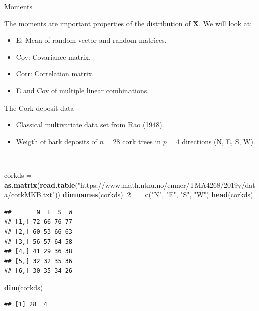 \documentclass[
  ignorenonframetext,
]{beamer}
\newenvironment{Shaded}{\begin{snugshade}}{\end{snugshade}}
\newcommand{\DecValTok}[1]{\textcolor[rgb]{0.00,0.00,0.81}{#1}}
\newcommand{\FunctionTok}[1]{\textcolor[rgb]{0.13,0.29,0.53}{\textbf{#1}}}
\newcommand{\NormalTok}[1]{#1}
\newcommand{\OtherTok}[1]{\textcolor[rgb]{0.56,0.35,0.01}{#1}}
\newcommand{\StringTok}[1]{\textcolor[rgb]{0.31,0.60,0.02}{#1}}
\providecommand{\tightlist}{%
  \setlength{\itemsep}{0pt}\setlength{\parskip}{0pt}}
\begin{document}
\begin{frame}
\begin{block}{Moments}
\protect\hypertarget{moments}{}
\vspace{2mm}

The moments are important properties of the distribution of
\(\boldsymbol{X}\). We will look at:

\vspace{2mm}

\begin{itemize}
\tightlist
\item
  E: Mean of random vector and random matrices.
\item
  Cov: Covariance matrix.
\item
  Corr: Correlation matrix.
\item
  E and Cov of multiple linear combinations.
\end{itemize}
\end{block}
\end{frame}

\begin{frame}[fragile]
\begin{block}{The Cork deposit data}
\protect\hypertarget{the-cork-deposit-data}{}
\(~\)

\begin{itemize}
\tightlist
\item
  Classical multivariate data set from Rao (1948).
\item
  Weigth of bark deposits of \(n=28\) cork trees in \(p=4\) directions
  (N, E, S, W).
\end{itemize}

\(~\)

\tiny

\begin{Shaded}
\begin{Highlighting}[]
\NormalTok{corkds }\OtherTok{=} \FunctionTok{as.matrix}\NormalTok{(}\FunctionTok{read.table}\NormalTok{(}\StringTok{"https://www.math.ntnu.no/emner/TMA4268/2019v/data/corkMKB.txt"}\NormalTok{))}
\FunctionTok{dimnames}\NormalTok{(corkds)[[}\DecValTok{2}\NormalTok{]] }\OtherTok{=} \FunctionTok{c}\NormalTok{(}\StringTok{"N"}\NormalTok{, }\StringTok{"E"}\NormalTok{, }\StringTok{"S"}\NormalTok{, }\StringTok{"W"}\NormalTok{)}
\FunctionTok{head}\NormalTok{(corkds)}
\end{Highlighting}
\end{Shaded}

\begin{verbatim}
##       N  E  S  W
## [1,] 72 66 76 77
## [2,] 60 53 66 63
## [3,] 56 57 64 58
## [4,] 41 29 36 38
## [5,] 32 32 35 36
## [6,] 30 35 34 26
\end{verbatim}

\begin{Shaded}
\begin{Highlighting}[]
\FunctionTok{dim}\NormalTok{(corkds)}
\end{Highlighting}
\end{Shaded}

\begin{verbatim}
## [1] 28  4
\end{verbatim}
\end{block}
\end{frame}
\end{document}
